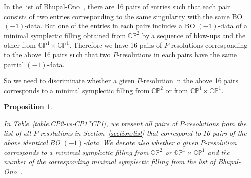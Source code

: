 \documentclass[reqno, twoside, a4paper]{amsart}
\newtheorem{proposition}[theorem]{Proposition}
\theoremstyle{definition}
\numberwithin{equation}{section}
\begin{document}
In the list of Bhupal-Ono~\cite[\S5]{Bhupal-Ono-2012}, there are 16 pairs of entries such that each pair consists of two entries corresponding to the same singularity with the same BO $(-1)$-data. But one of the entries in each pairs includes a BO $(-1)$-data of a minimal symplectic filling obtained from $\mathbb{CP}^2$ by a sequence of blow-ups and the other from $\mathbb{CP}^1 \times \mathbb{CP}^1$. Therefore we have 16 pairs of $P$-resolutions corresponding to the above 16 pairs such that two $P$-resolutions in each pairs have the same partial $(-1)$-data.

So we need to discriminate whether a given $P$-resolution in the above 16 pairs corresponds to a minimal symplectic filling from $\mathbb{CP}^2$ or from $\mathbb{CP}^1 \times \mathbb{CP}^1$.

\begin{proposition}
\label{proposition:CP2-vs-CP1*CP1}

In Table~\ref{table:CP2-vs-CP1*CP1}, we present all pairs of $P$-resolutions from the list of all $P$-resolutions in Section~\ref{section:list} that correspond to 16 pairs of the above identical BO $(-1)$-data. We denote also whether a given $P$-resolution corresponds to a minimal symplectic filling from $\mathbb{CP}^2$ or $\mathbb{CP}^1 \times \mathbb{CP}^1$ and the number of the corresponding minimal symplectic filling from the list of Bhupal-Ono~\cite[\S5]{Bhupal-Ono-2012}.
\end{proposition}
\end{document}
